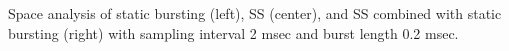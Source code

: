 \label{fig:hcct-space} Space analysis of static bursting (left), SS (center), and SS combined with static bursting (right) with sampling interval 2 msec and burst length 0.2 msec.

